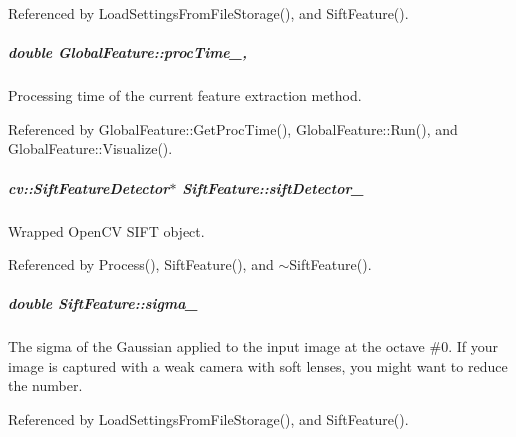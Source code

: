 Referenced by Load\-Settings\-From\-File\-Storage(), and Sift\-Feature().

\hypertarget{group___feature_extractor_aa3306975b929f5503dac51829f9e04a0}{
\subparagraph[{proc\-Time\-\_\-}]{\setlength{\rightskip}{0pt plus 5cm}double Global\-Feature\-::proc\-Time\-\_\-\hspace{0.3cm}{\ttfamily [protected]}, {\ttfamily [inherited]}}}\label{group___feature_extractor_aa3306975b929f5503dac51829f9e04a0}


Processing time of the current feature extraction method. 



Referenced by Global\-Feature\-::\-Get\-Proc\-Time(), Global\-Feature\-::\-Run(), and Global\-Feature\-::\-Visualize().

\hypertarget{group___feature_extractor_a4e08df2e30da758a11d029eae0352cf5}{
\subparagraph[{sift\-Detector\-\_\-}]{\setlength{\rightskip}{0pt plus 5cm}cv\-::\-Sift\-Feature\-Detector$\ast$ Sift\-Feature\-::sift\-Detector\-\_\-\hspace{0.3cm}{\ttfamily [private]}}}\label{group___feature_extractor_a4e08df2e30da758a11d029eae0352cf5}


Wrapped Open\-C\-V S\-I\-F\-T object. 



Referenced by Process(), Sift\-Feature(), and $\sim$\-Sift\-Feature().

\hypertarget{group___feature_extractor_a574fb46dbb906801014beb9a731b980a}{
\subparagraph[{sigma\-\_\-}]{\setlength{\rightskip}{0pt plus 5cm}double Sift\-Feature\-::sigma\-\_\-\hspace{0.3cm}{\ttfamily [private]}}}\label{group___feature_extractor_a574fb46dbb906801014beb9a731b980a}


The sigma of the Gaussian applied to the input image at the octave \#0. If your image is captured with a weak camera with soft lenses, you might want to reduce the number. 



Referenced by Load\-Settings\-From\-File\-Storage(), and Sift\-Feature().

